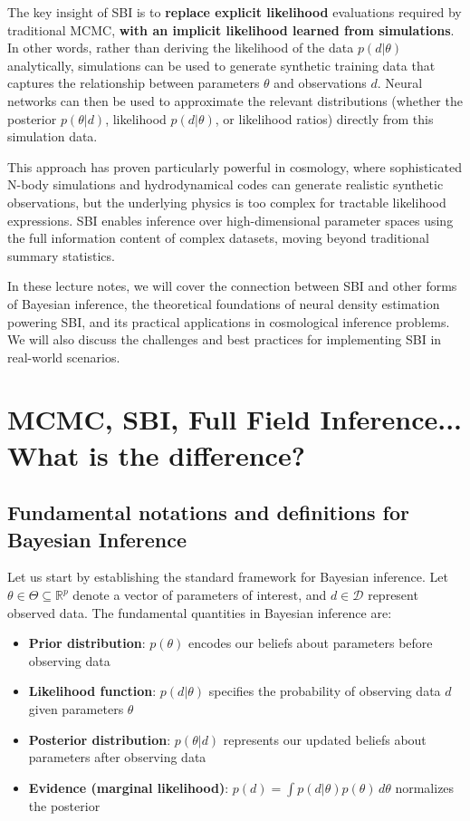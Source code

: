 \documentclass{SciPost}
\begin{document}
The key insight of SBI is to \textbf{replace explicit likelihood} evaluations required by traditional MCMC, \textbf{with an implicit likelihood learned from simulations}. In other words, rather than deriving the likelihood of the data $p(d|\theta)$ analytically, simulations can be used to generate synthetic training data that captures the relationship between parameters $\theta$ and observations $d$. Neural networks can then be used to approximate the relevant distributions (whether the posterior $p(\theta|d)$, likelihood $p(d|\theta)$, or likelihood ratios) directly from this simulation data.

This approach has proven particularly powerful in cosmology, where sophisticated N-body simulations and hydrodynamical codes can generate realistic synthetic observations, but the underlying physics is too complex for tractable likelihood expressions. SBI enables inference over high-dimensional parameter spaces using the full information content of complex datasets, moving beyond traditional summary statistics.

In these lecture notes, we will cover the connection between SBI and other forms of Bayesian inference, the theoretical foundations of neural density estimation powering SBI, and its practical applications in cosmological inference problems. We will also discuss the challenges and best practices for implementing SBI in real-world scenarios.

\section{MCMC, SBI, Full Field Inference... What is the difference?}

\subsection{Fundamental notations and definitions for Bayesian Inference}

Let us start by establishing the standard framework for Bayesian inference. Let $\theta \in \Theta \subseteq \mathbb{R}^p$ denote a vector of parameters of interest, and $d \in \mathcal{D}$ represent observed data. The fundamental quantities in Bayesian inference are:

\begin{itemize}
    \item \textbf{Prior distribution}: $p(\theta)$ encodes our beliefs about parameters before observing data
    \item \textbf{Likelihood function}: $p(d|\theta)$ specifies the probability of observing data $d$ given parameters $\theta$
    \item \textbf{Posterior distribution}: $p(\theta|d)$ represents our updated beliefs about parameters after observing data
    \item \textbf{Evidence (marginal likelihood)}: $p(d) = \int p(d|\theta)p(\theta) \, d\theta$ normalizes the posterior
\end{itemize}
\end{document}
